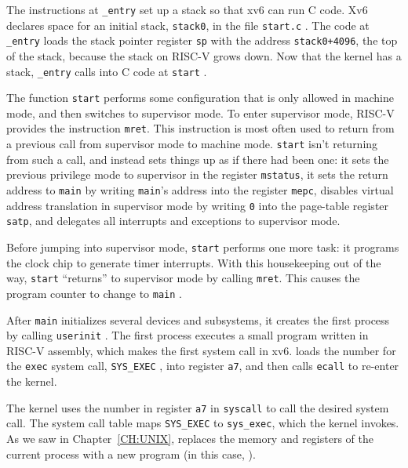 The instructions at
\lstinline{_entry}
set up a stack so that xv6 can run C code.
Xv6 declares space for an initial stack,
\lstinline{stack0},
in the file
\lstinline{start.c}
.
The code at
\lstinline{_entry}
loads the stack pointer register
\texttt{sp}
with the address
\lstinline{stack0+4096},
the top of the stack, because the stack
on RISC-V grows down.
Now that the kernel has a stack,
\lstinline{_entry}
calls into C code at
\lstinline{start}
.

The function
\lstinline{start}
performs some configuration that is only allowed in
machine mode, and then switches to supervisor mode.
To enter supervisor mode, RISC-V
provides the instruction
\lstinline{mret}.
This instruction is most often used to return from
a previous call from supervisor mode to machine mode.
\lstinline{start} isn't returning from such a call, and
instead sets things up as if there had been one:
it sets the previous privilege mode to
supervisor in the register
\lstinline{mstatus},
it sets the return address to
\lstinline{main}
by writing
\lstinline{main}'s
address into
the register
\lstinline{mepc},
disables virtual address translation in supervisor mode
by writing
\lstinline{0}
into the page-table register
\lstinline{satp},
and delegates all interrupts and exceptions
to supervisor mode.

Before jumping into supervisor mode,
\lstinline{start}
performs one more task: it programs the clock
chip to generate timer interrupts.
With this housekeeping out of the way,
\lstinline{start}
``returns'' to supervisor
mode by calling
\lstinline{mret}.
This causes the program counter to change
to
\lstinline{main}
.

After
\lstinline{main}
initializes several devices and subsystems, 
it creates the first process by calling 
\lstinline{userinit}
.
The first process executes a small program written in RISC-V assembly,
which makes the first system call in xv6.
 loads the number for the \lstinline{exec}
system call, \lstinline{SYS_EXEC}
,
into
register {\tt a7},
and then calls \lstinline{ecall} to re-enter the kernel.

The kernel uses the number in register {\tt a7} in \lstinline{syscall}
 to call the desired system call.
The system call table  maps
\lstinline{SYS_EXEC} to \lstinline{sys_exec}, which the kernel
invokes.  As we saw in Chapter~\ref{CH:UNIX}, 
replaces the memory and registers of the current process with a new
program (in this case, ).

